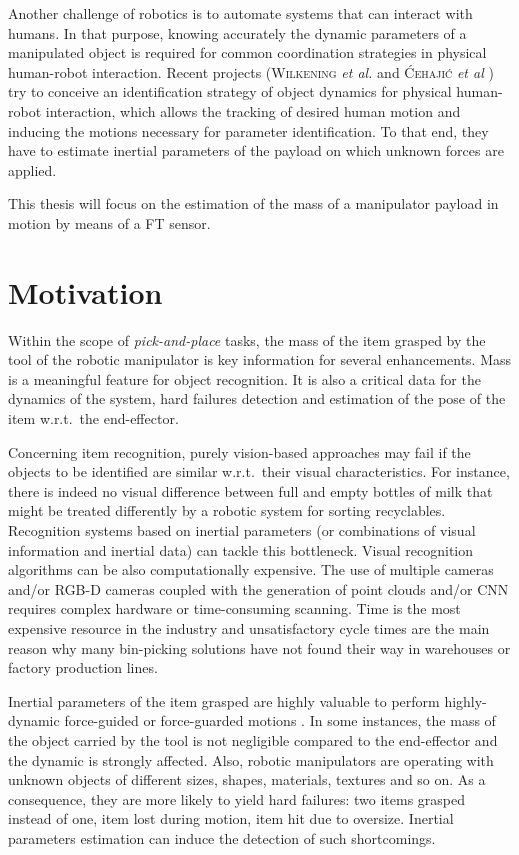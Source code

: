 \documentclass[/home/francois/latex/report/main.tex]{subfiles}
\begin{document}
Another challenge of robotics is to automate systems that can interact with humans. In that purpose, knowing accurately the dynamic parameters of a manipulated object is required for common coordination strategies in physical human-robot interaction. Recent projects (\textsc{Wilkening} \textit{et al.} \cite{Wilkening2016} and \textsc{Ćehajić} \textit{et al} \cite{Ćehajić2017}) try to conceive an identification strategy of object dynamics for physical human-robot interaction, which allows the tracking of desired human motion and inducing the motions necessary for parameter identification. To that end, they have to estimate inertial parameters of the payload on which unknown forces are applied.

This thesis will focus on the estimation of the mass of a manipulator payload in motion by means of a \ac{FT} sensor.

\section{Motivation}

Within the scope of \textit{pick-and-place} tasks, the mass of the item grasped by the tool of the robotic manipulator is key information for several enhancements. Mass is a meaningful feature for object recognition. It is also a critical data for the dynamics of the system, hard failures detection and estimation of the pose of the item w.r.t.\ the end-effector.

Concerning item recognition, purely vision-based approaches may fail if the objects to be identified are similar w.r.t.\ their visual characteristics. For instance, there is indeed no visual difference between full and empty bottles of milk that might be treated differently by a robotic system for sorting recyclables. Recognition systems based on inertial parameters (or combinations of visual information and inertial data) can tackle this bottleneck.
Visual recognition algorithms can be also computationally expensive. The use of multiple cameras and/or RGB-D cameras coupled with the generation of point clouds and/or \ac{CNN} requires complex hardware or time-consuming scanning. Time is the most expensive resource in the industry and unsatisfactory cycle times are the main reason why many bin-picking solutions have not found their way in warehouses or factory production lines.

Inertial parameters of the item grasped are highly valuable to perform highly-dynamic force-guided or force-guarded motions \cite{Garcia2006, KubusKroger2008}. In some instances, the mass of the object carried by the tool is not negligible compared to the end-effector and the dynamic is strongly affected.
Also, robotic manipulators are operating with unknown objects of different sizes, shapes, materials, textures and so on. As a consequence, they are more likely to yield hard failures: two items grasped instead of one, item lost during motion, item hit due to oversize. Inertial parameters estimation can induce the detection of such shortcomings.
\end{document}
